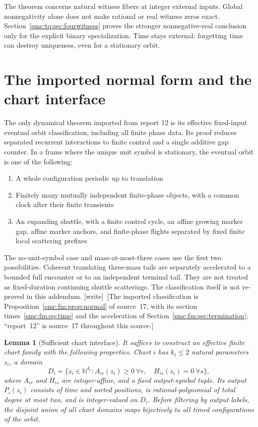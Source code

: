 \documentclass[11pt,letterpaper]{article}
\numberwithin{equation}{section}
\newtheorem{lemma}[theorem]{Lemma}
\theoremstyle{definition}
\theoremstyle{remark}
\newcommand{\NN}{\mathbb N}
\newcommand{\wtag}{\textup{[write]}}
\begin{document}
The theorem concerns natural witness fibers at integer external inputs.
Global nonnegativity alone does not make rational or real witness zeros
exact. Section~\ref{smc:tq:sec:fourwitness} proves the stronger nonnegative-real
conclusion only for the explicit binary specialization. Time stays external:
forgetting time can destroy uniqueness, even for a stationary orbit.

\section{The imported normal form and the chart interface}\label{smc:tq:sec:interface}
The only dynamical theorem imported from report 12 is its effective
fixed-input eventual orbit classification, including all finite phase data.
Its proof reduces separated recurrent interactions to finite control and a
single additive gap counter. In a frame where the unique unit symbol is
stationary, the eventual orbit is one of the following:
\begin{enumerate}
\item A whole configuration periodic up to translation
\item Finitely many mutually independent finite-phase objects, with a common
clock after their finite transients
\item An expanding shuttle, with a finite control cycle, an affine growing
marker gap, affine marker anchors, and finite-phase flights separated by
fixed finite local scattering prefixes
\end{enumerate}
The no-unit-symbol case and mass-at-most-three cases use the first two
possibilities. Coherent translating three-mass tails are separately
accelerated to a bounded full encounter or to an independent terminal tail.
They are not treated as fixed-duration continuing shuttle scatterings.
The classification itself is not re-proved in this addendum.
\wtag\ [The imported classification is Proposition~\ref{smc:fm:prop:normal} of source~17, with its section times~\eqref{smc:fm:eq:time} and the acceleration of Section~\ref{smc:fm:sec:termination}; ``report~12'' is source~17 throughout this source.]

\begin{lemma}[Sufficient chart interface]\label{smc:tq:lem:interface}
It suffices to construct an effective finite chart family with the following
properties. Chart $i$ has $k_i\le2$ natural parameters $z_i$, a domain
\[
 D_i=\{z_i\in\NN^{k_i}: A_{ir}(z_i)\ge0\ \forall r,\quad
 H_{is}(z_i)=0\ \forall s\},
\]
where $A_{ir}$ and $H_{is}$ are integer-affine, and a fixed output-symbol
tuple. Its output $P_i(z_i)$ consists of time and sorted positions, is
rational-polynomial of total degree at most two, and is integer-valued on
$D_i$. Before filtering by output labels, the disjoint union of all chart
domains maps bijectively to all timed configurations of the orbit.
\end{lemma}
\end{document}
